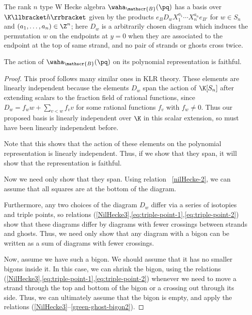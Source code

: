 \begin{prop}\label{prop:waha-basis}
 The rank $n$ type W Hecke algebra $\waha_{\mathscr{B}}(\pq)$ has a basis over $\K\llbracket h\rrbracket $ given by the products
 $e_{B}D_wX_1^{a_1}\cdots X_n^{a_n}e_{B'}$ for $w\in S_n$ and $(a_1,\dots,
 a_n)\in \Z^n$; here $D_w$ is a arbitrarily chosen diagram which
 induces the permutation $w$ on the endpoints at $y=0$ when they are
 associated to the endpoint at the top of same strand, and no pair of
 strands or ghosts cross twice.

 The action of $\waha_{\mathscr{B}}(\pq)$ on its polynomial
 representation is faithful.
\end{prop}
\begin{proof}
 This proof follows many similar ones in KLR theory. These elements
 are linearly independent because the elements $D_w$ span the action
 of $\K[S_n]$ after extending scalars to the fraction field of
 rational functions, since $D_w=f_w w+\sum_{v<w} f_v v$ for some
 rational functions $f_v$ with $f_w\neq 0$. Thus our proposed basis
 is linearly independent over $\K$ in this scalar extension, so must
 have been linearly independent before.

 Note that this shows that the action of these elements on the
 polynomial representation is linearly independent. Thus, if we show
 that they span, it will show that the representation is faithful. 

 Now we need only show that they span. Using relation
~\eqref{nilHecke-2}, we can assume that all squares are at the bottom
 of the diagram. 

Furthermore, any two choices of the diagram $D_w$ differ via a series
of isotopies and triple points, so relations
(\ref{NilHecke3},\ref{eq:triple-point-1},\ref{eq:triple-point-2}) show
that these diagrams differ by diagrams with fewer crossings between
strands and ghosts. Thus, we
need only show that any diagram with a bigon can be written as a sum
of diagrams with fewer crossings. 

Now, assume we have such a bigon. We should assume that it has no
smaller bigons inside it. In this case, we can shrink the bigon,
using the relations
(\ref{NilHecke3},\ref{eq:triple-point-1},\ref{eq:triple-point-2})
whenever we need to move a strand through the top and bottom of the
bigon or a crossing out through its side. Thus, we can ultimately
assume that the bigon is empty, and apply the relations (\ref{NilHecke3}--\ref{green-ghost-bigon2}).
\end{proof}

